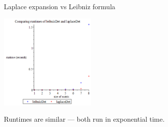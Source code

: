 \documentclass{beamer}
\begin{document}
\begin{frame}{Laplace expansion vs Leibniz formula}

    \begin{center}{}
        \includegraphics[height=180]{leibniz-laplace}
    \end{center}

    Runtimes are similar --- both run in exponential time.

\end{frame}
\end{document}
